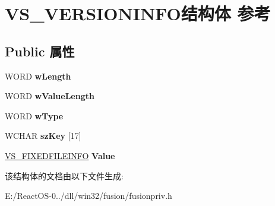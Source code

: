 \hypertarget{struct_v_s___v_e_r_s_i_o_n_i_n_f_o}{}\section{V\+S\+\_\+\+V\+E\+R\+S\+I\+O\+N\+I\+N\+F\+O结构体 参考}
\label{struct_v_s___v_e_r_s_i_o_n_i_n_f_o}
\subsection*{Public 属性}
\begin{DoxyCompactItemize}
\item 
\mbox{\label{struct_v_s___v_e_r_s_i_o_n_i_n_f_o_a0e6c4a9d1ec323cbd2be7cf19ebc31bc}} 
W\+O\+RD {\bfseries w\+Length}
\item 
\mbox{\label{struct_v_s___v_e_r_s_i_o_n_i_n_f_o_a66e7ff0259f771a616584fffab46e5b3}} 
W\+O\+RD {\bfseries w\+Value\+Length}
\item 
\mbox{\label{struct_v_s___v_e_r_s_i_o_n_i_n_f_o_a69c928d7b7265a5ed79224c98f516386}} 
W\+O\+RD {\bfseries w\+Type}
\item 
\mbox{\label{struct_v_s___v_e_r_s_i_o_n_i_n_f_o_a063a5c7a5c97737ab1838638cbba481b}} 
W\+C\+H\+AR {\bfseries sz\+Key} \mbox{[}17\mbox{]}
\item 
\mbox{\label{struct_v_s___v_e_r_s_i_o_n_i_n_f_o_ac63f745070711b78accc62ef6828c3f2}} 
\hyperlink{structtag_v_s___f_i_x_e_d_f_i_l_e_i_n_f_o}{V\+S\+\_\+\+F\+I\+X\+E\+D\+F\+I\+L\+E\+I\+N\+FO} {\bfseries Value}
\end{DoxyCompactItemize}


该结构体的文档由以下文件生成\+:\begin{DoxyCompactItemize}
\item 
E\+:/\+React\+O\+S-\/0../dll/win32/fusion/fusionpriv.\+h\end{DoxyCompactItemize}

